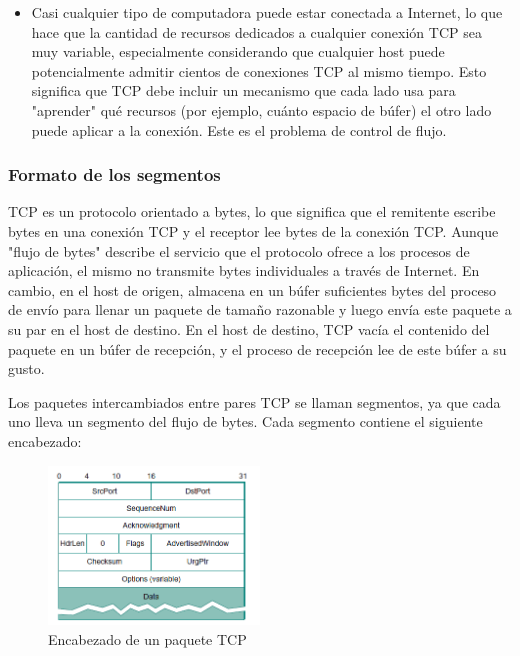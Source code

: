 \begin{itemize}
  \item Casi cualquier tipo de computadora puede estar conectada a Internet, lo que hace que la cantidad de recursos dedicados a cualquier conexión TCP sea muy variable, especialmente considerando que cualquier host puede potencialmente admitir cientos de conexiones TCP al mismo tiempo. Esto significa que TCP debe incluir un mecanismo que cada lado usa para "aprender" qué recursos (por ejemplo, cuánto espacio de búfer) el otro lado puede aplicar a la conexión. Este es el problema de control de flujo.
\end{itemize}

\subsubsection{Formato de los segmentos}
TCP es un protocolo orientado a bytes, lo que significa que el remitente escribe bytes en una conexión TCP y el receptor lee bytes de la conexión TCP. Aunque "flujo de bytes" describe el servicio que el protocolo ofrece a los procesos de aplicación, el mismo no transmite bytes individuales a través de Internet. En cambio, en el host de origen, almacena en un búfer suficientes bytes del proceso de envío para llenar un paquete de tamaño razonable y luego envía este paquete a su par en el host de destino. En el host de destino, TCP vacía el contenido del paquete en un búfer de recepción, y el proceso de recepción lee de este búfer a su gusto.

Los paquetes intercambiados entre pares TCP se llaman segmentos, ya que cada uno lleva un segmento del flujo de bytes. Cada segmento contiene el siguiente encabezado:

\begin{figure}[H]
	\centering
	\includegraphics[width=0.5\textwidth
]{images/tcp-header.png}
	\caption[Encabezado de un paquete TCP]{Encabezado de un paquete TCP}
	\label{fig:tcp-header}
\end{figure}

